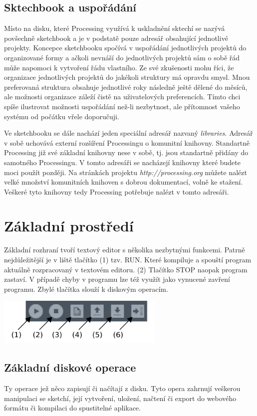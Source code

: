 \documentclass[11pt]{book}
\newcommand{\oddil}[1]{\section{#1}\label{sec:#1}}
\newcommand{\pododdil}[1]{\subsection{#1}\label{subsec:#1}}
\begin{document}
\pododdil{Sktechbook a uspořádání}

Místo na disku, které Processing využívá k uskladnění sktechí se nazývá povšechně sketchbook a je v podstatě pouze adresář obsahující jednotlivé projekty. Koncepce sketchbooku spočívá v uspořádání jednotlivých projektů do organizované formy a ačkoli nevnáší do jednotlivých projektů sám o sobě řád může napomoci k vytvoření řádu vlastního. Ze své zkušenosti mohu říci, že organizace jednotlivých projektů do jakékoli struktury má opravdu smysl. Mnou preferovaná struktura obsahuje jednotlivé roky následně ještě dělené do měsíců, ale možnosti organizace záleží čistě na uživatelových preferencích. Tímto chci spíše ilustrovat možnosti uspořádání než-li nezbytnost, ale přítomnost vašeho systému od počátku vřele doporučuji.

Ve sketchbooku se dále nachází jeden speciální adresář nazvaný {\em libraries}. Adresář v sobě uchovává externí rozšíření Processingu o komunitní knihovny. Standartně Processing již své základní knihovny nese v sobě, tj. jsou standartně přidány do samotného Processingu. V tomto adresáři se nacházejí knihovny které budete moci použít později. Na stránkách projektu {\em http://processing.org} můžete nalézt velké množství komunitních knihoven s dobrou dokumentací, volně ke stažení. Veškeré tyto knihovny tedy Processing potřebuje nalézt v tomto adresáři.


\oddil{Základní prostředí}


Základní rozhraní tvoří textový editor s několika nezbytnými funkcemi. Patrně nejdůležitější je v liště tlačítko (1) tzv. RUN. Které kompiluje a spouští program aktuálně rozpracovaný v textovém editoru. (2) Tlačítko STOP naopak program zastaví. V případě chyby v programu lze též využít jako vynucené zavření programu. Zbylé tlačítka slouží k diskovým operacím. \\


\begin{center}
\includegraphics[width = 0.6\textwidth]{imgs/buttons.png}
\end{center}


\newpage
\pododdil{Základní diskové operace}

Ty operace jež něco zapisují či načítají z disku. Tyto opera zahrnují veškerou manipulaci se sketchí, její vytvoření, uložení, načtení či export do webového formátu či kompilaci do spustitelné aplikace.
\end{document}
